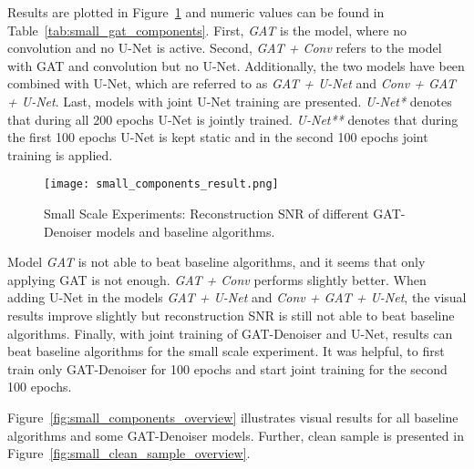 Results are plotted in Figure~\ref{fig:small_components} and numeric values can be found in Table~\ref{tab:small_gat_components}.
First, \textit{GAT} is the model, where no convolution and no U-Net is active. 
Second, \textit{GAT + Conv} refers to the model with GAT and convolution but no U-Net.
Additionally, the two models have been combined with U-Net, which are referred to as 
\textit{GAT + U-Net} and \textit{Conv + GAT + U-Net}.
Last, models with joint U-Net training are presented.
\textit{U-Net*} denotes that during all 200 epochs U-Net is jointly trained.
\textit{U-Net**} denotes that during the first 100 epochs U-Net is kept static 
and in the second 100 epochs  joint training is applied.


\begin{figure}[H]
  \centering
  
  \texttt{[image: small\_components\_result.png]}
  \caption{Small Scale Experiments: Reconstruction SNR of different GAT-Denoiser models and baseline algorithms.}
  \label{fig:small_components}
\end{figure}

Model \textit{GAT} is not able to beat baseline algorithms, and it seems that only applying GAT is not enough.
\textit{GAT + Conv} performs slightly better. When adding U-Net in the models \textit{GAT + U-Net}  and \textit{Conv + GAT + U-Net},
the visual results improve slightly but reconstruction SNR is still not able to beat baseline algorithms.
Finally, with joint training of GAT-Denoiser and U-Net, 
results can beat baseline algorithms for the small scale experiment. It was helpful, to first train only GAT-Denoiser for 100 epochs 
and start joint training for the second 100 epochs.

Figure~\ref{fig:small_components_overview} illustrates visual results for all baseline algorithms and some GAT-Denoiser models.
Further, clean sample is presented in Figure~\ref{fig:small_clean_sample_overview}.

